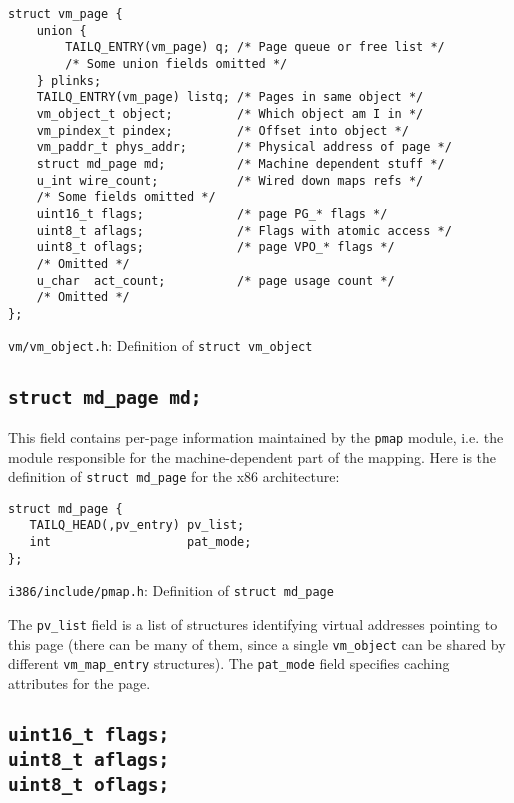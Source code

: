 \documentclass[shortabstract, english]{iithesis}
\begin{document}
\begin{listing}[H]
\begin{verbatim}
struct vm_page {
    union {
        TAILQ_ENTRY(vm_page) q; /* Page queue or free list */
        /* Some union fields omitted */
    } plinks;
    TAILQ_ENTRY(vm_page) listq; /* Pages in same object */
    vm_object_t object;         /* Which object am I in */
    vm_pindex_t pindex;         /* Offset into object */
    vm_paddr_t phys_addr;       /* Physical address of page */
    struct md_page md;          /* Machine dependent stuff */
    u_int wire_count;           /* Wired down maps refs */
    /* Some fields omitted */
    uint16_t flags;             /* page PG_* flags */
    uint8_t aflags;             /* Flags with atomic access */
    uint8_t oflags;             /* page VPO_* flags */
    /* Omitted */
    u_char  act_count;          /* page usage count */
    /* Omitted */
};
\end{verbatim}
\caption{\texttt{vm/vm\_object.h}: Definition of \texttt{struct vm_object}}
\end{listing}

\subsection*{\texttt{struct md_page md;}}
This field contains per-page information maintained by the \texttt{pmap}
module, i.e. the module responsible for the machine-dependent part of the mapping.
Here is the definition of \texttt{struct md_page} for the x86
architecture:

\begin{listing}[H]
\begin{verbatim}
struct md_page {
   TAILQ_HEAD(,pv_entry) pv_list;
   int                   pat_mode;
};
\end{verbatim}
\caption{\texttt{i386/include/pmap.h}: Definition of \texttt{struct md_page}}
\end{listing}

The \texttt{pv_list} field is a list of structures identifying virtual
addresses pointing to this page (there can be many of them, since a single
\texttt{vm_object} can be shared by different
\texttt{vm_map_entry} structures). The \texttt{pat_mode} field
specifies caching attributes for the page.

\subsection*{\texttt{uint16_t flags;} \\ \texttt{uint8_t aflags;}
  \\ \texttt{uint8_t oflags;}}
\end{document}
